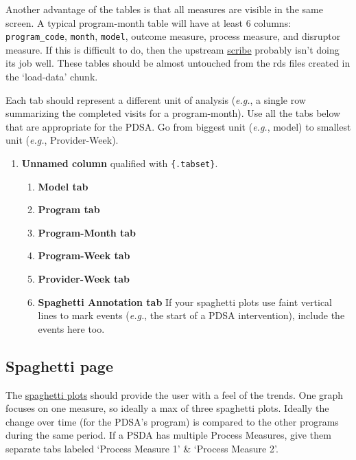 \documentclass[
]{book}
\providecommand{\tightlist}{%
  \setlength{\itemsep}{0pt}\setlength{\parskip}{0pt}}
\begin{document}
Another advantage of the tables is that all measures are visible in the same screen. A typical program-month table will have at least 6 columns: \texttt{program\_code}, \texttt{month}, \texttt{model}, outcome measure, process measure, and disruptor measure. If this is difficult to do, then the upstream \protect\hyperlink{pattern-scribe}{scribe} probably isn't doing its job well. These tables should be almost untouched from the rds files created in the `load-data' chunk.

Each tab should represent a different unit of analysis (\emph{e.g.}, a single row summarizing the completed visits for a program-month). Use all the tabs below that are appropriate for the PDSA. Go from biggest unit (\emph{e.g.}, model) to smallest unit (\emph{e.g.}, Provider-Week).

\begin{enumerate}
\def\labelenumi{\arabic{enumi}.}
\item
  \textbf{Unnamed column} qualified with \texttt{\{.tabset\}}.

  \begin{enumerate}
  \def\labelenumii{\arabic{enumii}.}
  \tightlist
  \item
    \textbf{Model tab}
  \item
    \textbf{Program tab}
  \item
    \textbf{Program-Month tab}
  \item
    \textbf{Program-Week tab}
  \item
    \textbf{Provider-Week tab}
  \item
    \textbf{Spaghetti Annotation tab} If your spaghetti plots use faint vertical lines to mark events (\emph{e.g.}, the start of a PDSA intervention), include the events here too.
  \end{enumerate}
\end{enumerate}

\hypertarget{spaghetti-page}{%
\subsection{Spaghetti page}\label{spaghetti-page}}

The \href{https://ouhscbbmc.github.io/data-science-practices-1/dashboard-1.html\#spaghetti}{spaghetti plots} should provide the user with a feel of the trends. One graph focuses on one measure, so ideally a max of three spaghetti plots. Ideally the change over time (for the PDSA's program) is compared to the other programs during the same period. If a PSDA has multiple Process Measures, give them separate tabs labeled `Process Measure 1' \& `Process Measure 2'.
\end{document}
